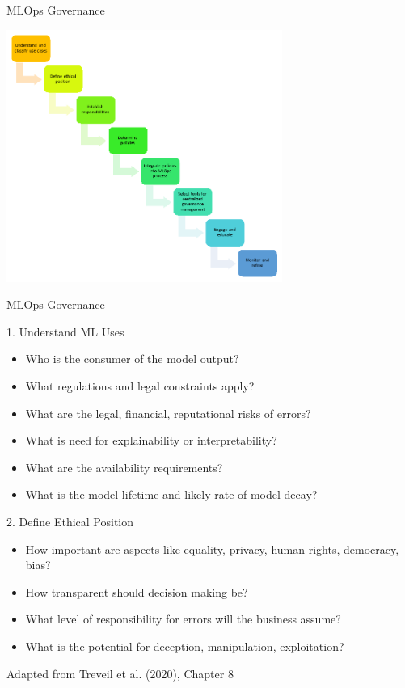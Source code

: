 \documentclass[ignorenonframetext,xcolor=x11names]{beamer}
\begin{document}
\begin{frame}{MLOps Governance}
\centering

\includegraphics[height=3.25in]{governancegraphics.png}
\end{frame}

\begin{frame}{MLOps Governance}
\footnotesize
\begin{block}{1. Understand ML Uses}
\begin{itemize}
  \item Who is the consumer of the model output?
  \item What regulations and legal constraints apply?
  \item What are the legal, financial, reputational risks of errors?
  \item What is need for explainability or interpretability?
  \item What are the availability requirements?
  \item What is the model lifetime and likely rate of model decay?
\end{itemize}
\end{block}

\begin{block}{2. Define Ethical Position}
\begin{itemize}
  \item How important are aspects like equality, privacy, human rights, democracy, bias?
  \item How transparent should decision making be?
  \item What level of responsibility for errors will the business assume?
  \item What is the potential for deception, manipulation, exploitation?
\end{itemize}
\end{block}
\tiny Adapted from Treveil et al. (2020), Chapter 8
\end{frame}
\end{document}

